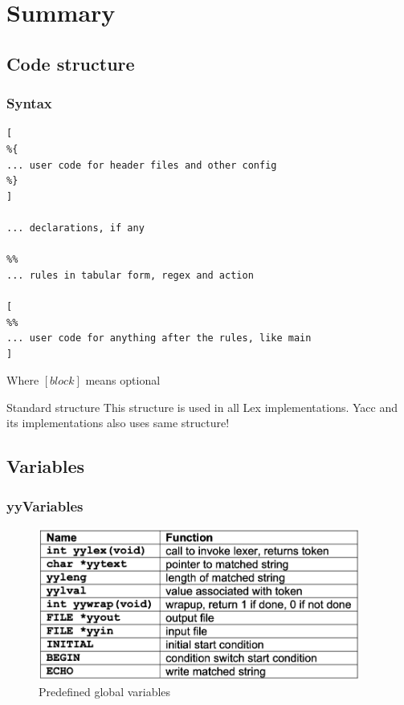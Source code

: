 \documentclass{beamer}
\begin{document}
\section{Summary}

\subsection{Code structure}

\begin{frame}[fragile]
    \frametitle{Syntax}
    
    \begin{lstlisting}[basicstyle=\tiny]
[
%{
... user code for header files and other config
%}
]

... declarations, if any

%%
... rules in tabular form, regex and action

[
%%
... user code for anything after the rules, like main
]
    \end{lstlisting}
    
    Where $[ block ]$ means optional
    
    \begin{alertblock}{Standard structure}
        This structure is used in all Lex implementations.
        Yacc and its implementations also uses same structure!
    \end{alertblock}
\end{frame}

\subsection{Variables}

\begin{frame}
    \frametitle{yyVariables}

    \begin{figure}
        \centering
        \includegraphics[height=5cm]{imgs/vars.png}
        \caption{Predefined global variables}
        \label{fig:variables}
    \end{figure}
\end{frame}
\end{document}
